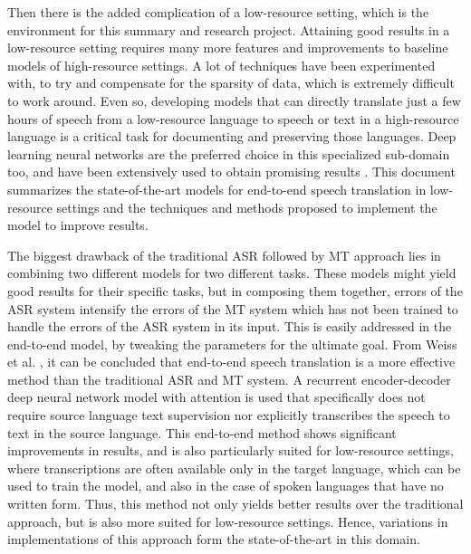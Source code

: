 \documentclass{article}
\begin{document}
Then there is the added complication of a low-resource setting, which is the environment for this summary and research project. Attaining good results in a low-resource setting requires many more features and improvements to baseline models of high-resource settings. A lot of techniques have been experimented with, to try and compensate for the sparsity of data, which is extremely difficult to work around. Even so, developing models that can directly translate just a few hours of speech from a low-resource language to speech or text in a high-resource language is a critical task for documenting and preserving those languages. Deep learning neural networks are the preferred choice in this specialized sub-domain too, and have been extensively used to obtain promising results \cite{Miao:13, Thomas:13, Chen:15, Thomas:16}. This document summarizes the state-of-the-art models for end-to-end speech translation in low-resource settings and the techniques and methods proposed to implement the model to improve results. \medskip

The biggest drawback of the traditional ASR followed by MT approach lies in combining two different models for two different tasks. These models might yield good results for their specific tasks, but in composing them together, errors of the ASR system intensify the errors of the MT system which has not been trained to handle the errors of the ASR system in its input. This is easily addressed in the end-to-end model, by tweaking the parameters for the ultimate goal. From Weiss et al. \cite{Weiss:17}, it can be concluded that end-to-end speech translation is a more effective method than the traditional ASR and MT system. A recurrent encoder-decoder deep neural network model with attention is used that specifically does not require source language text supervision nor explicitly transcribes the speech to text in the source language. This end-to-end method shows significant improvements in results, and is also particularly suited for low-resource settings, where transcriptions are often available only in the target language, which can be used to train the model, and also in the case of spoken languages that have no written form. Thus, this method not only yields better results over the traditional approach, but is also more suited for low-resource settings. Hence, variations in implementations of this approach form the state-of-the-art in this domain. \medskip
\end{document}
